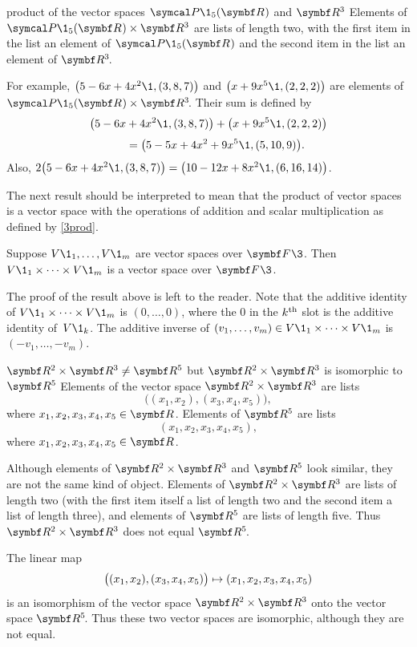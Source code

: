 \begin{example}{product of the vector spaces\/ $\P\1_5(\R{})$ and $\R3$}
Elements of $\P\1_5(\R{}) \times \R3$ are lists of length two, with the first item in the list an element of $\P\1_5(\R{})$ and the second item in the list an element of $\RR3$.

For example,
$\paren[\big]{ 5 - 6x + 4x^2\1, (3, 8, 7) }$ and $\paren[\big]{x + 9x^5\1, (2,2,2)}$ are elements of $\P\1_5(\R{}) \times \RR3$. Their sum is defined by
\begin{align*}
\paren[\big]{ 5 - 6x &+ 4x^2\1, (3, 8, 7) } + \paren[\big]{x + 9x^5\1, (2,2,2) } \\[3bp]
&= \paren[\big]{ 5 - 5x + 4x^2 + 9x^5\1, (5, 10,9) }.
\end{align*}
Also, $2 \paren[\big]{ 5 - 6x + 4x^2\1, (3, 8, 7) } = \paren[\big]{ 10 - 12x + 8x^2\1, (6, 16,14) }$.
\end{example}

The next result should be interpreted to mean that the product of vector spaces is a vector space with the operations of addition and scalar multiplication as defined by \ref{3prod}.

{Suppose $V\1_1, \dots, V\1_m$ are vector spaces over $\F{}\3$. Then $V\1_1 \times \dots \times V\1_m$ is a vector space over $\F{}\3$.}

The proof of the result above is left to the reader. Note that the additive identity of $V\1_1 \times \dots \times V\1_m$ is $(0, \dots, 0)$, where the $0$ in the $k^{\text{{th}}}$ slot is the additive identity of~$V\1_k$. The additive inverse of $(v_1, \dots, v_m) \in V\1_1 \times \dots \times V\1_m$ is $(-v_1, \dots, -v_m)$.

\begin{example}{$\R2 \times \R3 \ne \R5$ but $\R2 \times \R3$ is isomorphic to $\R5$}
Elements of the vector space $\R2 \times \R3$ are lists
\[
\bigl( (x_1, x_2), (x_3, x_4, x_5) \bigr),
\]
where $x_1, x_2, x_3, x_4, x_5 \in \R{}$. Elements of $\R5$ are lists
\[
(x_1, x_2, x_3, x_4, x_5),
\]
where $x_1, x_2, x_3, x_4, x_5 \in \R{}$.

Although elements of $\R2 \times \R3$ and $\R5$ look similar, they are not the same kind of object. Elements of $\R2 \times \R3$ are lists of length two (with the first item itself a list of length two and the second item a list of length three), and elements of $\R5$ are lists of length five. Thus $\R2 \times \R3$ does not equal $\RR5$.

\addtolength{\marnotewidth}{-.1in}
\addtolength{\marlen}{-.1in}

The linear map
\[\overfullrule=0bp
\bigl( (x_1, x_2), (x_3, x_4, x_5) \bigr) \mapsto (x_1, x_2, x_3, x_4, x_5)
\]
is an isomorphism of the vector space $\R2 \times \R3$ onto the vector space $\RR5$. Thus these two vector spaces are isomorphic, although they are not equal.
\end{example}

